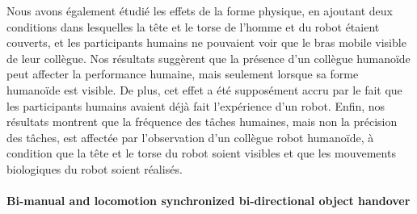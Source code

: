 Nous avons également étudié les effets de la forme physique, en ajoutant deux conditions dans lesquelles la tête et le torse de l'homme et du robot étaient couverts, et les participants humains ne pouvaient voir que le bras mobile visible de leur collègue. Nos résultats suggèrent que la présence d'un collègue humanoïde peut affecter la performance humaine, mais seulement lorsque sa forme humanoïde est visible. De plus, cet effet a été supposément accru par le fait que les participants humains avaient déjà fait l'expérience d'un robot. Enfin, nos résultats montrent que la fréquence des tâches humaines, mais non la précision des tâches, est affectée par l'observation d'un collègue robot humanoïde, à condition que la tête et le torse du robot soient visibles et que les mouvements biologiques du robot soient réalisés.



\paragraph*{\LARGE {Bi-manual and locomotion synchronized bi-directional object handover \\}\\}

